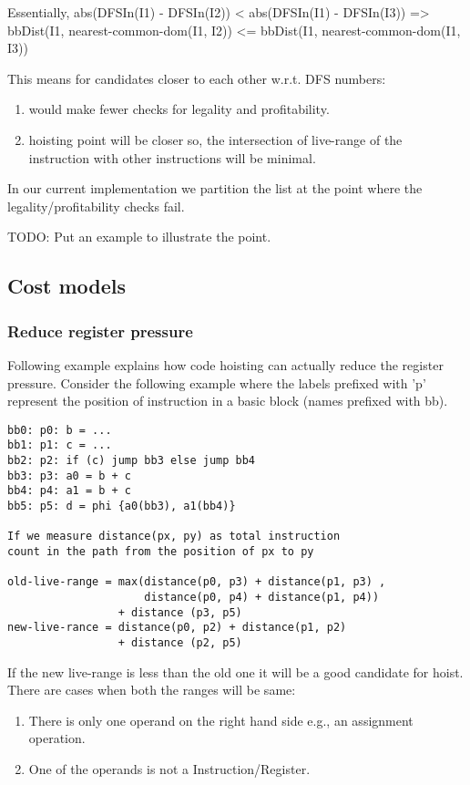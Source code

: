 \documentclass{sig-alternate}
\begin{document}
Essentially,
abs(DFSIn(I1) - DFSIn(I2)) < abs(DFSIn(I1) - DFSIn(I3))
=> bbDist(I1, nearest-common-dom(I1, I2)) <= bbDist(I1, nearest-common-dom(I1, I3))

This means for candidates closer to each other w.r.t. DFS numbers:
\begin{enumerate}
\item would make fewer checks for legality and profitability.
\item hoisting point will be closer so, the intersection of live-range of the
  instruction with other instructions will be minimal.
\end{enumerate}

In our current implementation we partition the list at the point where the
legality/profitability checks fail.

TODO: Put an example to illustrate the point.

\subsection{Cost models}

\subsubsection{Reduce register pressure}
\label{hoist:reg-pressure}
Following example explains how code hoisting can actually reduce the register pressure.
Consider the following example where the labels prefixed with 'p' represent the position of
instruction in a basic block (names prefixed with bb).

\begin{verbatim}
bb0: p0: b = ...
bb1: p1: c = ...
bb2: p2: if (c) jump bb3 else jump bb4
bb3: p3: a0 = b + c
bb4: p4: a1 = b + c
bb5: p5: d = phi {a0(bb3), a1(bb4)}

If we measure distance(px, py) as total instruction
count in the path from the position of px to py

old-live-range = max(distance(p0, p3) + distance(p1, p3) ,
                     distance(p0, p4) + distance(p1, p4))
                 + distance (p3, p5)
new-live-rance = distance(p0, p2) + distance(p1, p2)
                 + distance (p2, p5)
\end{verbatim}

If the new live-range is less than the old one it will be a good candidate
for hoist. There are cases when both the ranges will be same:
\begin{enumerate}
  \item There is only one operand on the right hand side e.g., an assignment operation.
  \item One of the operands is not a Instruction/Register.
\end{enumerate}
\end{document}
